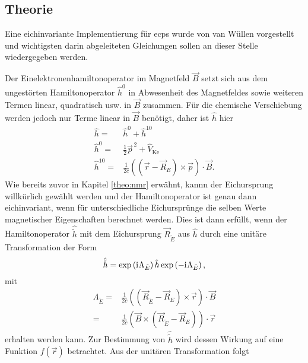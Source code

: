 	\subsection{Theorie}
	Eine eichinvariante Implementierung für \acp{ecp} wurde von van Wüllen\supercite{van2012use} vorgestellt und wichtigsten darin abgeleiteten Gleichungen sollen an dieser Stelle wiedergegeben werden. 
	
	Der Einelektronenhamiltonoperator im Magnetfeld $\vec{B}$ setzt sich aus dem ungestörten Hamiltonoperator $\hat{h}^0$ in Abwesenheit des Magnetfeldes sowie weiteren Termen linear, quadratisch usw. in $\vec{B}$ zusammen. Für die chemische Verschiebung werden jedoch nur Terme linear in $\vec{B}$ benötigt, daher ist $\hat{h}$ hier
	\begin{equation}
	\begin{aligned}
	\hat{h}=&\hat{h}^0+\hat{h}^{10}\\
	\hat{h}^0=&\frac{1}{2}\vec{p}^{\,2}+\hat{V}_{\textrm{Ke}}\\
	\hat{h}^{10}=&\frac{1}{2c}\left(\left(\vec{r}-\vec{R}_E\right)\times\vec{p}\right)\cdot\vec{B}.
	\end{aligned}
	\end{equation}
	Wie bereits zuvor in Kapitel \ref{theo:nmr} erwähnt, kannn der Eichursprung willkürlich gewählt werden und der Hamiltonoperator ist genau dann eichinvariant, wenn für unterschiedliche Eichursprünge die selben Werte magnetischer Eigenschaften berechnet werden. Dies ist dann erfüllt, wenn der Hamiltonoperator $\hat{\tilde{h}}$ mit dem Eichursprung $\vec{R}_{\tilde{E}}$ aus $\hat{h}$ durch eine unitäre Transformation der Form
	\begin{equation}\label{eq:trans}
	\hat{\tilde{h}}=\exp\left(\mathrm{i}\mkern1mu\Lambda_{\tilde{E}}\right)\hat{h}\exp\left(-\mathrm{i}\mkern1mu\Lambda_{\tilde{E}}\right),
	\end{equation}
	mit 
	\begin{equation}
	\begin{aligned}
	\Lambda_{\tilde{E}}=&\frac{1}{2c}\left(\left(\vec{R}_{\tilde{E}}-\vec{R}_E\right)\times\vec{r}\right)\cdot\vec{B}\\
	=&\frac{1}{2c}\left(\vec{B}\times\left(\vec{R}_{\tilde{E}}-\vec{R}_E\right)\right)\cdot\vec{r}
	\end{aligned}
	\end{equation}
	erhalten werden kann. Zur Bestimmung von $\hat{\tilde{h}}$ wird dessen Wirkung auf eine Funktion $f(\vec{r})$ betrachtet. Aus der unitären Transformation folgt
	
